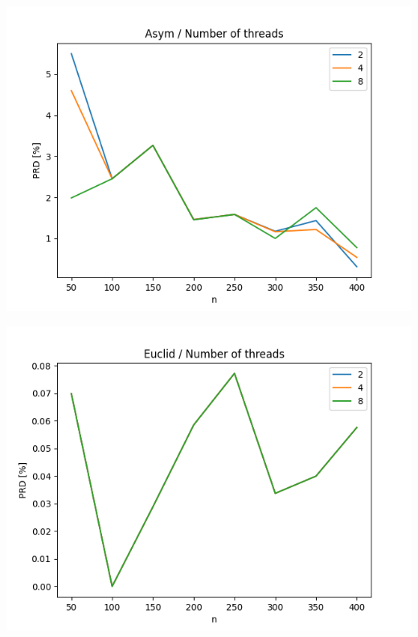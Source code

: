 \documentclass{article}
\begin{document}
\begin{center}
\includegraphics[width=\textwidth, 
                   height = 0.4\textheight, 
                   keepaspectratio]
                  {plots/asym_12_num_of_threads} 
\end{center}

\begin{center}
\includegraphics[width=\textwidth, 
                   height = 0.4\textheight, 
                   keepaspectratio]
                  {plots/euclid_12_num_of_threads} 
\end{center}
\end{document}
